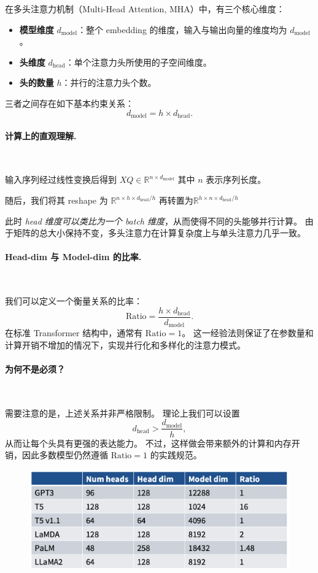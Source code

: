 在多头注意力机制（Multi-Head Attention, MHA）中，有三个核心维度：  

\begin{itemize}
    \item \textbf{模型维度} $d_{\text{model}}$：整个 embedding 的维度，输入与输出向量的维度均为 $d_{\text{model}}$。
    \item \textbf{头维度} $d_{\text{head}}$：单个注意力头所使用的子空间维度。
    \item \textbf{头的数量} $h$：并行的注意力头个数。
\end{itemize}

三者之间存在如下基本约束关系：
\[
    d_{\text{model}} = h \times d_{\text{head}}.
\]

\paragraph{计算上的直观理解.}~{}

输入序列经过线性变换后得到 $XQ \in \mathbb{R}^{n \times d_{\text{model}}}$
其中 $n$ 表示序列长度。

随后，我们将其 reshape 为
$\mathbb{R}^{n \times h \times d_{\text{head}}/h}$
再转置为$\mathbb{R}^{h \times n \times d_{\text{head}}/h}$

此时 \emph{head 维度可以类比为一个 batch 维度}，从而使得不同的头能够并行计算。
由于矩阵的总大小保持不变，多头注意力在计算复杂度上与单头注意力几乎一致。

\paragraph{Head-dim 与 Model-dim 的比率.}~{}

我们可以定义一个衡量关系的比率：
\[
    \text{Ratio} = \frac{h \times d_{\text{head}}}{d_{\text{model}}}.
\]
在标准 Transformer 结构中，通常有 $\text{Ratio} = 1$。
这一经验法则保证了在参数量和计算开销不增加的情况下，实现并行化和多样化的注意力模式。



\paragraph{为何不是必须？}~{}

需要注意的是，上述关系并非严格限制。
理论上我们可以设置
\[
    d_{\text{head}} > \frac{d_{\text{model}}}{h},
\]
从而让每个头具有更强的表达能力。
不过，这样做会带来额外的计算和内存开销，因此多数模型仍然遵循 $\text{Ratio}=1$ 的实践规范。

\begin{figure}[htbp]
  \centering
  \includegraphics[width=0.8\linewidth]{figs/lec3/lec3.23.png}
\end{figure}



